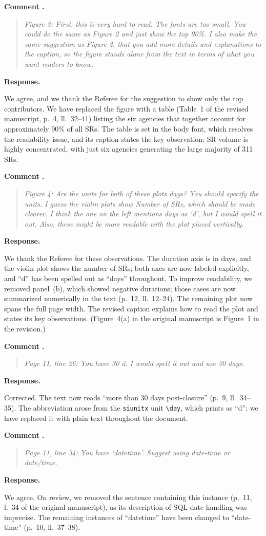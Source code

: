 \documentclass[11pt]{article}
\newcounter{refcomment}
\newcommand{\refcomment}[1]{%
  \FloatBarrier
  \stepcounter{refcomment}%
  \par\medskip
  \noindent\textbf{Comment \therefcomment.}
  \begin{quote}\itshape #1\end{quote}
  \noindent\textbf{Response.}~}
\begin{document}
\refcomment{Figure 3: First, this is very hard to read. The fonts are
too small. You could do the same as Figure 2 and just show the top
90\%. I also make the same suggestion as Figure 2, that you add more
details and explanations to the caption, so the figure stands alone
from the text in terms of what you want readers to know.}

We agree, and we thank the Referee for the suggestion to show only the
top contributors. We have replaced the figure with a table (Table~1 of
the revised manuscript, p.~4, ll.~32--41) listing the six agencies that together
account for approximately 90\% of all SRs. The table is set in the body
font, which resolves the readability issue, and its caption states the
key observation: SR volume is highly concentrated, with just six
agencies generating the large majority of 311 SRs.

\refcomment{Figure 4: Are the units for both of these plots days? You
should specify the units. I guess the violin plots show Number of SRs,
which should be made clearer. I think the one on the left mentions days
as `d', but I would spell it out. Also, these might be more readable
with the plot placed vertically.}

We thank the Referee for these observations. The duration axis is in
days, and the violin plot shows the number of SRs; both axes are now
labeled explicitly, and ``d'' has been spelled out as ``days''
throughout. To improve readability, we removed panel~(b), which showed
negative durations; those cases are now summarized numerically in the
text (p.~12, ll.~12--24). The remaining plot now spans the full page
width. The revised caption explains how to read the plot and states its
key observations. (Figure~4(a) in the original manuscript is Figure~1
in the revision.)

\refcomment{Page 11, line 26: You have 30 d. I would spell it out and
use 30 days.}

Corrected. The text now reads ``more than 30 days post-closure''
(p.~9, ll.~34--35). The abbreviation arose from the \texttt{siunitx}
unit \verb|\day|, which prints as ``d''; we have replaced it with plain
text throughout the document.

\refcomment{Page 11, line 34: You have `datetime'. Suggest using
date-time or date/time.}

We agree. On review, we removed the sentence containing this instance
(p.~11, l.~34 of the original manuscript), as its description of SQL
date handling was imprecise. The remaining instances of ``datetime''
have been changed to ``date-time'' (p.~10, ll.~37--38).
\end{document}
